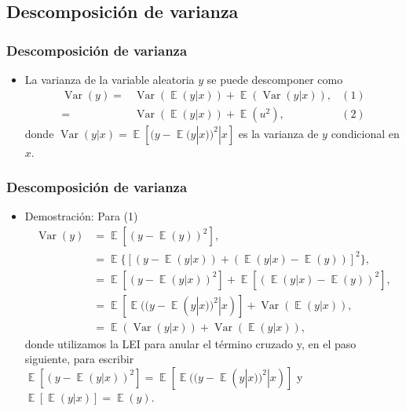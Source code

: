 \documentclass[t, compress, spanish, aspectratio=169]{beamer}
\DeclareMathOperator{\Var}{Var}
\DeclareMathOperator{\E}{\mathbb{E}}
\begin{document}
    \subsection{Descomposici\'on de varianza}
    \begin{frame}
        \frametitle{Descomposici\'on de varianza}
        \begin{itemize}
            \item <1-> La varianza de la variable aleatoria $y$ se puede descomponer como
                \begin{align*}
                    \Var(y) = & \Var(\E(y|x)) + \E(\Var(y|x)) ,&(1)\\
                              = & \Var(\E(y|x)) + \E(u^2), &(2)
                \end{align*}
            donde $\Var(y|x)=\E[(y-\E(y|x))^2|x]$ es la varianza de  $y$ condicional en $x$.
                 \end{itemize}
    \end{frame}
    \begin{frame}
        \frametitle{Descomposici\'on de varianza}
        \begin{itemize}
            \item Demostraci\'on: Para (1) 
            \begin{align*}
                \Var(y) & = \E[(y-\E(y))^2],\\
                          & = \E\{[(y-\E(y|x))+(\E(y|x)-\E(y))]^2\}, \\
                          & = \E[(y-\E(y|x))^2]         + \E[(\E(y|x)-\E(y))^2], \\
                          & = \E[\E((y-\E(y|x))^2|x)] + \Var(\E(y|x)),\\
                          & = \E(\Var(y|x))               + \Var(\E(y|x)),
            \end{align*}
            donde utilizamos la LEI para anular el t\'ermino cruzado y, en el paso siguiente, para escribir $\E[(y-\E(y|x))^2]=\E[\E((y-\E(y|x))^2|x)]$ y $\E[\E(y|x)]=\E(y)$.
        \end{itemize}
    \end{frame}
\end{document}

